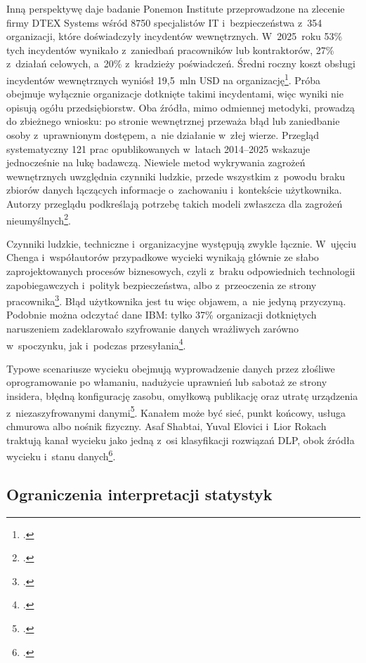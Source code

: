 \documentclass[12pt,a4paper]{article}
\begin{document}
Inną perspektywę daje badanie Ponemon Institute przeprowadzone na zlecenie
firmy DTEX Systems wśród 8750 specjalistów IT i~bezpieczeństwa z~354
organizacji, które doświadczyły incydentów wewnętrznych. W~2025~roku 53\%
tych incydentów wynikało z~zaniedbań pracowników lub kontraktorów, 27\%
z~działań celowych, a~20\% z~kradzieży poświadczeń. Średni roczny koszt
obsługi incydentów wewnętrznych wyniósł 19,5~mln USD na
organizację\footcite{ponemon2026insider}. Próba obejmuje wyłącznie
organizacje dotknięte takimi incydentami, więc wyniki nie opisują ogółu
przedsiębiorstw. Oba źródła, mimo odmiennej metodyki, prowadzą do zbieżnego
wniosku: po stronie wewnętrznej przeważa błąd lub zaniedbanie osoby
z~uprawnionym dostępem, a~nie działanie w~złej wierze. Przegląd
systematyczny 121 prac opublikowanych w~latach 2014--2025 wskazuje
jednocześnie na lukę badawczą. Niewiele metod wykrywania zagrożeń
wewnętrznych uwzględnia czynniki ludzkie, przede wszystkim z~powodu braku
zbiorów danych łączących informacje o~zachowaniu i~kontekście użytkownika.
Autorzy przeglądu podkreślają potrzebę takich modeli zwłaszcza dla zagrożeń
nieumyślnych\footcite{pathirana2026human}.

Czynniki ludzkie, techniczne i~organizacyjne występują zwykle łącznie.
W~ujęciu Chenga i~współautorów przypadkowe wycieki wynikają głównie ze słabo
zaprojektowanych procesów biznesowych, czyli z~braku odpowiednich technologii
zapobiegawczych i~polityk bezpieczeństwa, albo z~przeoczenia ze strony
pracownika\footcite{cheng2017enterprise}. Błąd użytkownika jest tu więc
objawem, a~nie jedyną przyczyną. Podobnie można odczytać dane IBM: tylko 37\%
organizacji dotkniętych naruszeniem zadeklarowało szyfrowanie danych
wrażliwych zarówno w~spoczynku, jak i~podczas
przesyłania\footcite{ibm2026cost}.

Typowe scenariusze wycieku obejmują wyprowadzenie danych przez złośliwe
oprogramowanie po włamaniu, nadużycie uprawnień lub sabotaż ze strony
insidera, błędną konfigurację zasobu, omyłkową publikację oraz utratę
urządzenia z~niezaszyfrowanymi danymi\footcite{cheng2017enterprise}. Kanałem
może być sieć, punkt końcowy, usługa chmurowa albo nośnik fizyczny. Asaf
Shabtai, Yuval Elovici i~Lior Rokach traktują kanał wycieku jako jedną z~osi
klasyfikacji rozwiązań DLP, obok źródła wycieku i~stanu
danych\footcite{shabtai2012survey}.

\subsection{Ograniczenia interpretacji statystyk}
\end{document}
